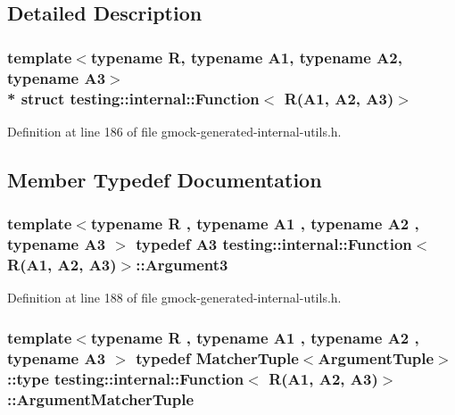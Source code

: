 \subsection{Detailed Description}
\subsubsection*{template$<$typename R, typename A1, typename A2, typename A3$>$\\*
struct testing\+::internal\+::\+Function$<$ R(\+A1, A2, A3)$>$}



Definition at line 186 of file gmock-\/generated-\/internal-\/utils.\+h.



\subsection{Member Typedef Documentation}
\subsubsection[{\texorpdfstring{Argument3}{Argument3}}]{\setlength{\rightskip}{0pt plus 5cm}template$<$typename R , typename A1 , typename A2 , typename A3 $>$ typedef A3 {\bf testing\+::internal\+::\+Function}$<$ {\bf R}(A1, A2, A3)$>$\+::{\bf Argument3}}\hypertarget{structtesting_1_1internal_1_1_function_3_01_r_07_a1_00_01_a2_00_01_a3_08_4_a2ac6eefb33feafe85c1c6742bdab509f}{}\label{structtesting_1_1internal_1_1_function_3_01_r_07_a1_00_01_a2_00_01_a3_08_4_a2ac6eefb33feafe85c1c6742bdab509f}


Definition at line 188 of file gmock-\/generated-\/internal-\/utils.\+h.

\subsubsection[{\texorpdfstring{Argument\+Matcher\+Tuple}{ArgumentMatcherTuple}}]{\setlength{\rightskip}{0pt plus 5cm}template$<$typename R , typename A1 , typename A2 , typename A3 $>$ typedef {\bf Matcher\+Tuple}$<${\bf Argument\+Tuple}$>$\+::type {\bf testing\+::internal\+::\+Function}$<$ {\bf R}(A1, A2, A3)$>$\+::{\bf Argument\+Matcher\+Tuple}}\hypertarget{structtesting_1_1internal_1_1_function_3_01_r_07_a1_00_01_a2_00_01_a3_08_4_acb08fa0fffe1213ce88f53343bb3b564}{}\label{structtesting_1_1internal_1_1_function_3_01_r_07_a1_00_01_a2_00_01_a3_08_4_acb08fa0fffe1213ce88f53343bb3b564}


